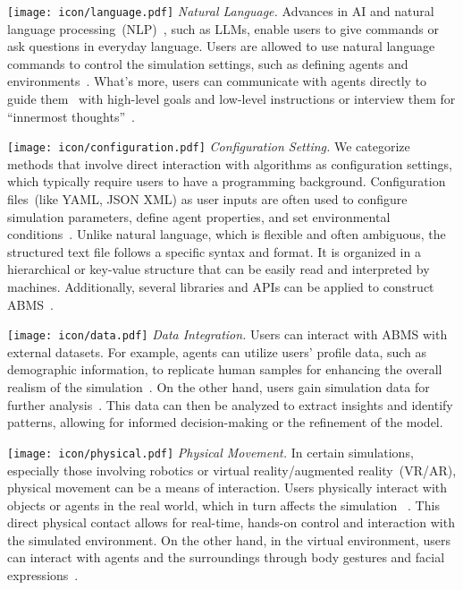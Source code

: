 \texttt{[image: icon/language.pdf]}
\textit{Natural Language.}
Advances in AI and natural language processing~(NLP)~\cite{bommasani2022opportunities,brown_language_2020}, such as LLMs, enable users to give commands or ask questions in everyday language.
Users are allowed to use natural language commands to control the simulation settings, such as defining agents and environments~\cite{wang2023humanoidagentsplatformsimulating,10.1145/3526113.3545616}.
What's more, users can communicate with agents directly to guide them~\cite{shridhar2020alfredbenchmarkinterpretinggrounded} with high-level goals and low-level instructions or interview them for ``innermost thoughts''~\cite{10.1145/3586183.3606763}.

\texttt{[image: icon/configuration.pdf]}
\textit{Configuration Setting.}
We categorize methods that involve direct interaction with algorithms as configuration settings, which typically require users to have a programming background.
Configuration files~(like YAML, JSON XML) as user inputs are often used to configure simulation parameters, define agent properties, and set environmental conditions~\cite{wang2024userbehaviorsimulationlarge,hua2024warpeacewaragentlarge}.
Unlike natural language, which is flexible and often ambiguous, the structured text file follows a specific syntax and format. 
It is organized in a hierarchical or key-value structure that can be easily read and interpreted by machines.
Additionally, several libraries and APIs can be applied to construct ABMS~\cite{li2023modelscopeagentbuildingcustomizableagent}.

\texttt{[image: icon/data.pdf]}
\textit{Data Integration.}
Users can interact with ABMS with external datasets.
For example, agents can utilize users' profile data, such as demographic information, to replicate human samples for enhancing the overall realism of the simulation~\cite{Argyle_Busby_Fulda_Gubler_Rytting_Wingate_2023,gao2023s3socialnetworksimulationlarge}.
On the other hand, users gain simulation data for further analysis~\cite{10.1145/3526113.3545616}.
This data can then be analyzed to extract insights and identify patterns, allowing for informed decision-making or the refinement of the model.


\texttt{[image: icon/physical.pdf]}
\textit{Physical Movement.}
In certain simulations, especially those involving robotics or virtual reality/augmented reality~(VR/AR), physical movement can be a means of interaction.
Users physically interact with objects or agents in the real world, which in turn affects the simulation ~\cite{mandi2023rocodialecticmultirobotcollaboration,10.1145/3613904.3642183}.
This direct physical contact allows for real-time, hands-on control and interaction with the simulated environment.
On the other hand, in the virtual environment, users can interact with agents and the surroundings through body gestures and facial expressions~\cite{10.1145/3613905.3637145,10.1145/3613904.3642947}.

